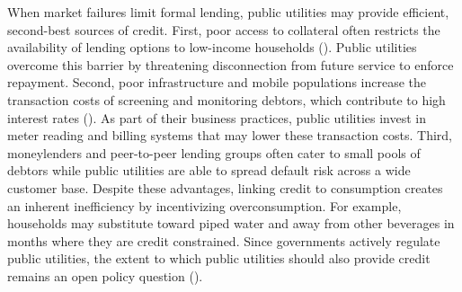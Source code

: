 \documentclass[12pt]{article}
\begin{document}





When market failures limit formal lending, public utilities may provide efficient, second-best sources of credit.  First, poor access to collateral often restricts the availability of lending options to low-income households (\cite{jack2016borrowing}).  Public utilities overcome this barrier by threatening disconnection from future service to enforce repayment.  Second, poor infrastructure and mobile populations increase the transaction costs of screening and monitoring debtors, which contribute to high interest rates (\cite{jack2014risk}).  As part of their business practices, public utilities invest in meter reading and billing systems that may lower these transaction costs.  Third, moneylenders and peer-to-peer lending groups often cater to small pools of debtors while public utilities are able to spread default risk across a wide customer base.  Despite these advantages, linking credit to consumption creates an inherent inefficiency by incentivizing overconsumption.  For example, households may substitute toward piped water and away from other beverages in months where they are credit constrained.  Since governments actively regulate public utilities, the extent to which public utilities should also provide credit remains an open policy question (\cite{laffont2005regulation}).  
\end{document}
